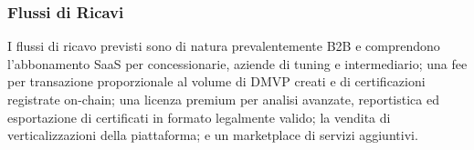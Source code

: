 \subsubsection*{Flussi di Ricavi}

I flussi di ricavo previsti sono di natura prevalentemente B2B e comprendono l'abbonamento SaaS per concessionarie, aziende di tuning e intermediario; una fee per transazione proporzionale al volume di DMVP creati e di certificazioni registrate on-chain; una licenza premium per analisi avanzate, reportistica ed esportazione di certificati in formato legalmente valido; la vendita di verticalizzazioni della piattaforma; e un marketplace di servizi aggiuntivi.